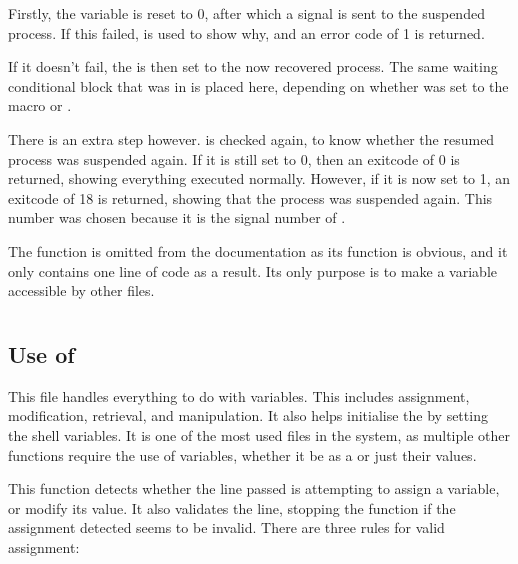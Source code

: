 \documentclass[12pt, a4paper]{report}
\begin{document}
                Firstly, the  variable is reset to 0, after which a
                 signal is sent to the suspended process. If this failed,
                 is used to show why, and an error code of 1 is returned.

                If it doesn't fail, the  is then set to the now
                recovered process. The same waiting conditional block that was in
                 is placed here, depending on whether 
                 was set to the macro  or .

                There is an extra step however.  is checked again,
                to know whether the resumed process was suspended again. If it is
                still set to 0, then an exitcode of 0 is returned, showing everything
                executed normally. However, if it is now set to 1, an exitcode of 
                18 is returned, showing that the process was suspended again.
                This number was chosen because it is the signal number of .

                 The  function is omitted from the
                documentation as its function is obvious, and it only contains one
                line of code as a result. Its only purpose is to make a variable
                accessible by other files.

                \clearpage
                
        \section{}
            \subsection{Use of }
                This file handles everything to do with variables.
                This includes assignment, modification, retrieval,
                and manipulation. It also helps initialise the
                 by setting the shell variables.
                It is one of the most used files in the system, as
                multiple other functions require the use of variables,
                whether it be as a  or just their values.

                This function detects whether the line passed is
                attempting to assign a variable, or modify its value.
                It also validates the line, stopping the function if
                the assignment detected seems to be invalid.
                There are three rules for valid assignment:
\end{document}
